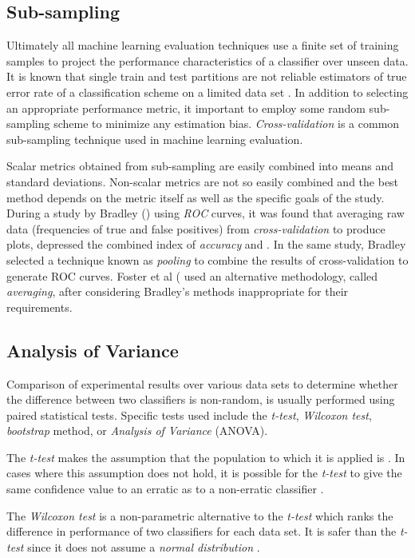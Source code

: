 \documentclass[10pt]{unbthesis}
\begin{document}
\subsection{Sub-sampling}
Ultimately all machine learning evaluation techniques use a finite set
of training samples to project the performance characteristics of a
classifier over unseen data. It is known that single train and test
partitions are not reliable estimators of true error rate of a
classification scheme on a limited data set \cite{RefWorks:57}. In
addition to selecting an appropriate performance metric, it important
to employ some random sub-sampling scheme to minimize any estimation
bias. \textit{Cross-validation} is a common sub-sampling technique
used in machine learning evaluation.

Scalar metrics obtained from sub-sampling are easily combined into
means and standard deviations. Non-scalar metrics are not so easily
combined and the best method depends on the metric itself as well as
the specific goals of the study. During a
study by Bradley (\cite{RefWorks:32}) using \textit{ROC} curves, it was found
that averaging raw data (frequencies of true and false positives) from
\textit{cross-validation} to produce plots,
depressed the combined index of \textit{accuracy} and . In the same study,
Bradley selected a technique known as \textit{pooling} to combine the
results of cross-validation to generate ROC curves. Foster et al
(\cite{RefWorks:45} used an alternative methodology, called
\textit{averaging}, after considering Bradley's methods inappropriate
for their requirements.


\subsection{Analysis of Variance}
Comparison of experimental results over various data sets to determine
whether the difference between two classifiers is non-random, is usually
performed using paired statistical tests. Specific tests used include the
\textit{t-test}, \textit{Wilcoxon test}, \textit{bootstrap} method,
or \textit{Analysis of Variance} (ANOVA).

The \textit{t-test} makes the assumption that the population to which
it is applied is . In cases where this assumption
does not hold, it is possible for the \textit{t-test} to give the same
confidence value to an erratic as to a non-erratic classifier
\cite{RefWorks:43}. 

The \textit{Wilcoxon test} is a non-parametric alternative to the
\textit{t-test} which ranks the difference in performance of two
classifiers for each data set. It is safer than the \textit{t-test}
since it does not assume a \textit{normal distribution}
\cite{RefWorks:47}. 
\end{document}
